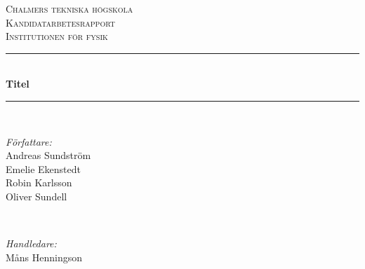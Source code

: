 \documentclass[11pt,a4paper, notitlepage]{report}
\begin{document}
\begin{titlepage}

\newcommand{\HRule}{\rule{\linewidth}{0.5mm}} %

\center %
 

\textsc{\LARGE Chalmers tekniska högskola}\\[1.5cm] %
\textsc{\Large Kandidatarbetesrapport}\\[0.5cm] %
\textsc{\large Institutionen för fysik }\\[0.5cm] %


\HRule \\[0.4cm]
{ \huge \bfseries Titel}\\[0.4cm] %
\HRule \\[1.5cm]
 

\begin{minipage}{0.4\textwidth}
\begin{flushleft} \large
\emph{Författare:}\\
Andreas Sundström\footnotemark{} \\
Emelie Ekenstedt\footnotemark{} \\
Robin Karlsson\footnotemark{} \\
Oliver Sundell\footnotemark{}
\end{flushleft}
\end{minipage}
~
\begin{minipage}{0.4\textwidth}
\begin{flushright} \large
\emph{Handledare:} \\
Måns Henningson
\end{flushright}
\end{minipage}\\[3cm]


\end{titlepage}
\end{document}
